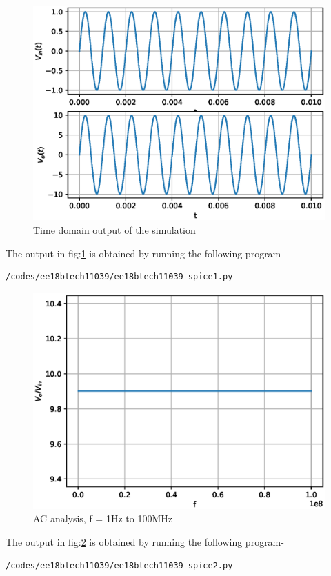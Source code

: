 \begin{enumerate}[label=\thesubsection.\arabic*.,ref=\thesubsection.\theenumi]
\begin{figure}[!h]
		\includegraphics[width=\columnwidth]{./figs/ee18btech11039/spice_1.eps}
\caption{Time domain output of the simulation}
\label{fig:ee18btech11039_fig6}
\end{figure}

The output in fig:\ref{fig:ee18btech11039_fig6} is obtained by running the following program-
\begin{lstlisting}
/codes/ee18btech11039/ee18btech11039_spice1.py
\end{lstlisting}
\begin{figure}[!h]
		\includegraphics[width=\columnwidth]{./figs/ee18btech11039/spice_2.eps}
\caption{AC analysis, f = 1Hz to 100MHz}
\label{fig:ee18btech11039_fig7}
\end{figure}
 
The output in fig:\ref{fig:ee18btech11039_fig7} is obtained by running the following program-
\begin{lstlisting}
/codes/ee18btech11039/ee18btech11039_spice2.py
\end{lstlisting}
\end{enumerate}